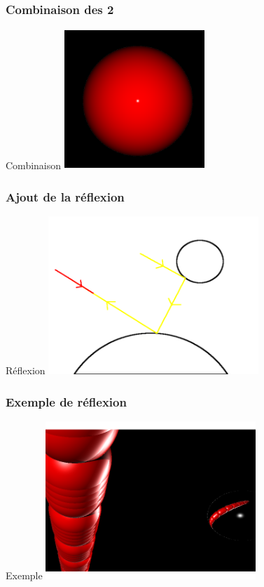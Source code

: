 \begin{frame}
	\frametitle{Combinaison des 2}
	\begin{block}{Combinaison}
		\includegraphics[width = 200px]{phong3.png} 
	\end{block}
\end{frame}

\begin{frame}
	\frametitle{Ajout de la réflexion}
	\begin{block}{Réflexion}
		\includegraphics[width = 300px]{reflection.png} 
	\end{block}
\end{frame}

\begin{frame}
	\frametitle{Exemple de réflexion}
	\begin{block}{Exemple}
		\includegraphics[width = 300px]{brillance.png} 
	\end{block}
\end{frame}

